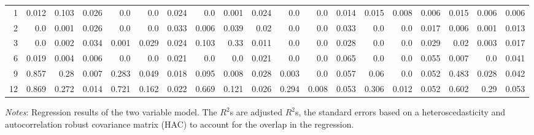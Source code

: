 \documentclass{article}
\begin{document}
\begin{landscape}
\begin{table}[h]
\begin{center}
\begin{tabular}{@{\extracolsep{5pt}}rrrrrrrrrrrrrrrrrrr@{}}
\hline

1 & 0.012 & 0.103 & 0.026 & 0.0 & 0.0 & 0.024 & 0.0 & 0.001 & 0.024 & 0.0 & 0.0 & 0.014 & 0.015 & 0.008 & 0.006 & 0.015 & 0.006 & 0.006 \\[6pt]
2 & 0.0 & 0.001 & 0.026 & 0.0 & 0.0 & 0.033 & 0.006 & 0.039 & 0.02 & 0.0 & 0.0 & 0.033 & 0.0 & 0.0 & 0.017 & 0.006 & 0.001 & 0.013 \\[6pt]
3 & 0.0 & 0.002 & 0.034 & 0.001 & 0.029 & 0.024 & 0.103 & 0.33 & 0.011 & 0.0 & 0.0 & 0.028 & 0.0 & 0.0 & 0.029 & 0.02 & 0.003 & 0.017 \\[6pt]
6 & 0.019 & 0.004 & 0.006 & 0.0 & 0.0 & 0.021 & 0.0 & 0.0 & 0.021 & 0.0 & 0.0 & 0.065 & 0.0 & 0.0 & 0.055 & 0.007 & 0.0 & 0.041 \\[6pt]
9 & 0.857 & 0.28 & 0.007 & 0.283 & 0.049 & 0.018 & 0.095 & 0.008 & 0.028 & 0.003 & 0.0 & 0.057 & 0.06 & 0.0 & 0.052 & 0.483 & 0.028 & 0.042 \\[6pt]
12 & 0.869 & 0.272 & 0.014 & 0.721 & 0.162 & 0.022 & 0.669 & 0.121 & 0.026 & 0.294 & 0.008 & 0.053 & 0.306 & 0.012 & 0.052 & 0.602 & 0.29 & 0.053 \\[6pt]

\hline

\end{tabular}

\end{center}
\textit{Notes}: Regression results of the two variable model. The $R^{2}$s are adjusted $R^{2}$s, the standard errors based on a heteroscedasticity and autocorrelation robust covariance matrix (HAC) to account for the overlap in the regression. 


\end{table}


\end{landscape}

\restoregeometry
\end{document}
